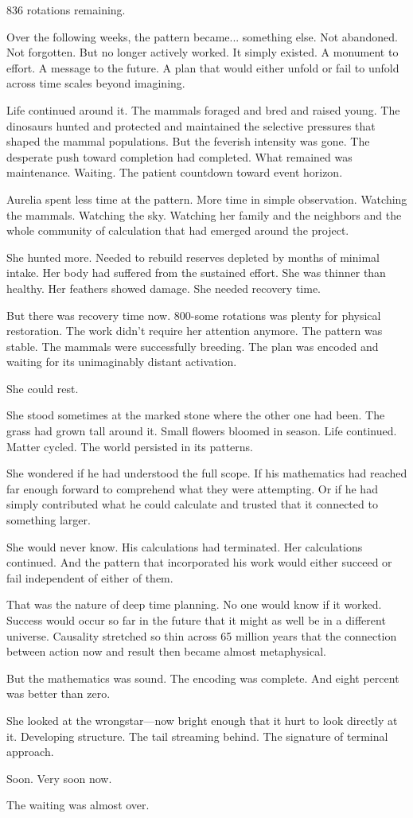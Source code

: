 836 rotations remaining.

\scenebreak

Over the following weeks, the pattern became... something else. Not abandoned. Not forgotten. But no longer actively worked. It simply existed. A monument to effort. A message to the future. A plan that would either unfold or fail to unfold across time scales beyond imagining.

Life continued around it. The mammals foraged and bred and raised young. The dinosaurs hunted and protected and maintained the selective pressures that shaped the mammal populations. But the feverish intensity was gone. The desperate push toward completion had completed. What remained was maintenance. Waiting. The patient countdown toward event horizon.

Aurelia spent less time at the pattern. More time in simple observation. Watching the mammals. Watching the sky. Watching her family and the neighbors and the whole community of calculation that had emerged around the project.

She hunted more. Needed to rebuild reserves depleted by months of minimal intake. Her body had suffered from the sustained effort. She was thinner than healthy. Her feathers showed damage. She needed recovery time.

But there was recovery time now. 800-some rotations was plenty for physical restoration. The work didn't require her attention anymore. The pattern was stable. The mammals were successfully breeding. The plan was encoded and waiting for its unimaginably distant activation.

She could rest.

She stood sometimes at the marked stone where the other one had been. The grass had grown tall around it. Small flowers bloomed in season. Life continued. Matter cycled. The world persisted in its patterns.

She wondered if he had understood the full scope. If his mathematics had reached far enough forward to comprehend what they were attempting. Or if he had simply contributed what he could calculate and trusted that it connected to something larger.

She would never know. His calculations had terminated. Her calculations continued. And the pattern that incorporated his work would either succeed or fail independent of either of them.

That was the nature of deep time planning. No one would know if it worked. Success would occur so far in the future that it might as well be in a different universe. Causality stretched so thin across 65 million years that the connection between action now and result then became almost metaphysical.

But the mathematics was sound. The encoding was complete. And eight percent was better than zero.

She looked at the wrongstar—now bright enough that it hurt to look directly at it. Developing structure. The tail streaming behind. The signature of terminal approach.

Soon. Very soon now.

The waiting was almost over.

